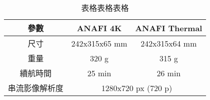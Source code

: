 \begin{table}[htbp]

\caption{表格表格表格}
\begin{center}
\tiny
\label{4-1}
\begin{adjustbox}{width=0.8\textwidth}
\begin{tabular}[c]{|c|c|c|}
    \hline
    參數 & ANAFI 4K & ANAFI Thermal \\
    \hline
    尺寸 & 242x315x65 mm & 242x315x64 mm \\
    \hline
    重量 &  320 g & 315 g \\
    \hline
     續航時間 & 25 min & 26 min \\
     \hline
     串流影像解析度  & \multicolumn{2}{c|}{1280x720 px (720 p)} \\
    \hline
\end{tabular}
\end{adjustbox}
\end{center}

\end{table}